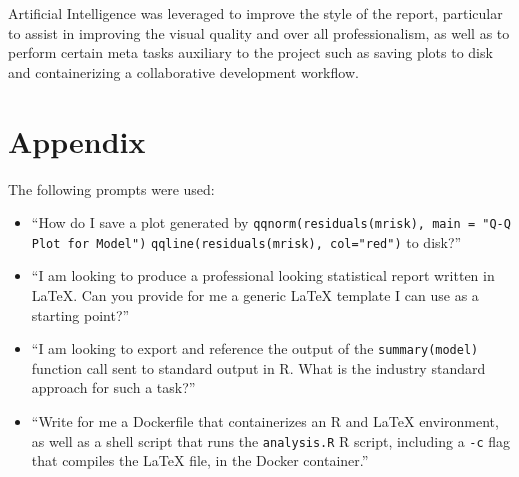 \documentclass[12pt, a4paper]{article}
\begin{document}
Artificial Intelligence was leveraged to improve the style of the report, particular to assist in improving the visual quality and over all professionalism, as well as to perform certain meta tasks auxiliary to the project such as saving plots to disk and containerizing a collaborative development workflow.

\section{Appendix}

The following prompts were used:
\begin{itemize}
    \item ``How do I save a plot generated by \texttt{qqnorm(residuals(mrisk), main = "Q-Q Plot for Model")} \texttt{qqline(residuals(mrisk), col="red")} to disk?''
    
    \item ``I am looking to produce a professional looking statistical report written in LaTeX. Can you provide for me a generic LaTeX template I can use as a starting point?''
    
    \item ``I am looking to export and reference the output of the \texttt{summary(model)} function call sent to standard output in R. What is the industry standard approach for such a task?''
    
    \item ``Write for me a Dockerfile that containerizes an R and LaTeX environment, as well as a shell script that runs the \texttt{analysis.R} R script, including a \texttt{-c} flag that compiles the LaTeX file, in the Docker container.''
\end{itemize}


\newpage


\end{document}
